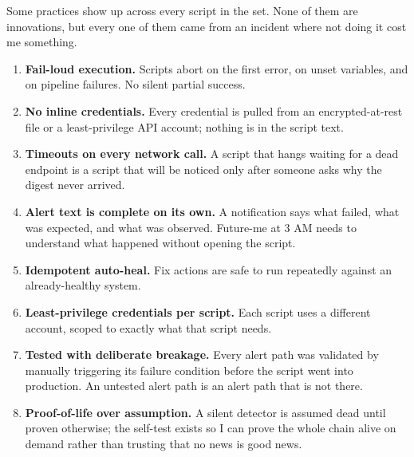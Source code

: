\documentclass[12pt]{article}
\begin{document}
Some practices show up across every script in the set. None of them are innovations, but every one of them came from an incident where not doing it cost me something.

\begin{enumerate}[leftmargin=18pt,itemsep=3pt]
  \item \textbf{Fail-loud execution.} Scripts abort on the first error, on unset variables, and on pipeline failures. No silent partial success.
  \item \textbf{No inline credentials.} Every credential is pulled from an encrypted-at-rest file or a least-privilege API account; nothing is in the script text.
  \item \textbf{Timeouts on every network call.} A script that hangs waiting for a dead endpoint is a script that will be noticed only after someone asks why the digest never arrived.
  \item \textbf{Alert text is complete on its own.} A notification says what failed, what was expected, and what was observed. Future-me at 3 AM needs to understand what happened without opening the script.
  \item \textbf{Idempotent auto-heal.} Fix actions are safe to run repeatedly against an already-healthy system.
  \item \textbf{Least-privilege credentials per script.} Each script uses a different account, scoped to exactly what that script needs.
  \item \textbf{Tested with deliberate breakage.} Every alert path was validated by manually triggering its failure condition before the script went into production. An untested alert path is an alert path that is not there.
  \item \textbf{Proof-of-life over assumption.} A silent detector is assumed dead until proven otherwise; the self-test exists so I can prove the whole chain alive on demand rather than trusting that no news is good news.
\end{enumerate}
\end{document}
